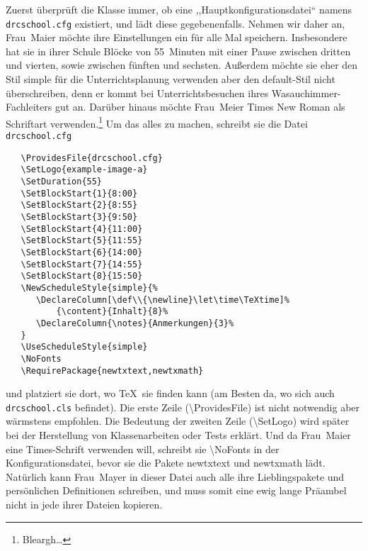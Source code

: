\documentclass[hyperworksheet]{drcschool}
\newcommand*{\cs}[1]{\textup{\ttfamily\textbackslash#1}}                   %
\newcommand*{\pkg}[1]{\textup{\ttfamily#1}}                                %
\newcommand*{\opt}[1]{\textup{\ttfamily#1}}                                %
\begin{document}
Zuerst überprüft die Klasse immer, ob eine ,,Hauptkonfigurationsdatei`` namens
\texttt{drcschool.cfg} existiert, und lädt diese gegebenenfalls.
Nehmen wir daher an, Frau~Maier möchte ihre Einstellungen ein für alle Mal speichern.
Insbesondere hat sie in ihrer Schule Blöcke von 55~Minuten mit einer Pause zwischen
dritten und vierten, sowie zwischen fünften und sechsten. Außerdem möchte sie
eher den Stil \opt{simple} für die Unterrichtsplanung verwenden aber den
\opt{default}-Stil nicht überschreiben, denn er kommt bei Unterrichtsbesuchen
ihres Wasauchimmer-Fachleiters gut an. Darüber hinaus möchte Frau~Meier
Times New Roman als Schriftart verwenden.\footnote{Bleargh\ldots}
Um das alles zu machen, schreibt sie die Datei \texttt{drcschool.cfg}
\begin{verbatim}
   \ProvidesFile{drcschool.cfg}
   \SetLogo{example-image-a}
   \SetDuration{55}
   \SetBlockStart{1}{8:00}
   \SetBlockStart{2}{8:55}
   \SetBlockStart{3}{9:50}
   \SetBlockStart{4}{11:00}
   \SetBlockStart{5}{11:55}
   \SetBlockStart{6}{14:00}
   \SetBlockStart{7}{14:55}
   \SetBlockStart{8}{15:50}
   \NewScheduleStyle{simple}{%
      \DeclareColumn[\def\\{\newline}\let\time\TeXtime]%
          {\content}{Inhalt}{8}%
      \DeclareColumn{\notes}{Anmerkungen}{3}%
   }
   \UseScheduleStyle{simple}
   \NoFonts
   \RequirePackage{newtxtext,newtxmath}
\end{verbatim}
und platziert sie dort, wo \TeX\ sie finden kann
(am Besten da, wo sich auch \texttt{drcschool.cls} befindet).
Die erste Zeile (\cs{ProvidesFile}) ist nicht notwendig aber wärmstens empfohlen.
Die Bedeutung der zweiten Zeile (\cs{SetLogo}) wird später bei der Herstellung
von Klassenarbeiten oder Tests erklärt. Und da Frau~Maier eine Times-Schrift
verwenden will, schreibt sie \cs{NoFonts} in der Konfigurationsdatei, bevor sie
die Pakete \pkg{newtxtext} und \pkg{newtxmath} lädt. Natürlich kann Frau~Mayer
in dieser Datei auch alle ihre Lieblingspakete und persönlichen Definitionen
schreiben, und muss somit eine ewig lange Präambel nicht in jede ihrer Dateien
kopieren.
\end{document}
